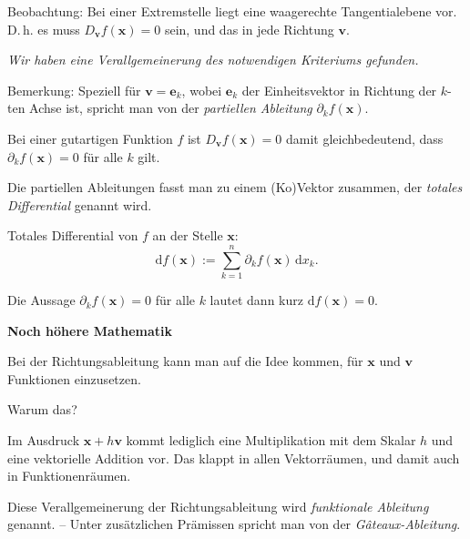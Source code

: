 \documentclass{beamer}
\newcommand{\strong}[1]{\textsf{\textbf{#1}}}
\begin{document}
\begin{frame}
Beobachtung: Bei einer Extremstelle liegt eine waagerechte
Tangentialebene vor. D.\,h. es muss $D_{\mathbf v} f(\mathbf x)=0$
sein, und das in jede Richtung $\mathbf v$.\pause

\vspace{0.8em}
\emph{Wir haben eine Verallgemeinerung des notwendigen Kriteriums
gefunden.}
\end{frame}

\begin{frame}
Bemerkung: Speziell für $\mathbf v = \mathbf e_k$, wobei
$\mathbf e_k$ der Einheitsvektor in Richtung der $k$-ten Achse ist,
spricht man von der \emph{partiellen Ableitung}
$\partial_k f(\mathbf x)$.
\pause

\vspace{0.8em}
Bei einer gutartigen Funktion $f$ ist $D_{\mathbf v}f(\mathbf x)=0$
damit gleichbedeutend, dass $\partial_k f(\mathbf x)=0$ für alle
$k$ gilt.
\end{frame}

\begin{frame}
Die partiellen Ableitungen fasst man zu einem (Ko)Vektor zusammen,
der \emph{totales Differential} genannt wird.\pause

\begin{Definition}
Totales Differential von $f$ an der Stelle $\mathbf x$:
\[\mathrm df(\mathbf x) := \sum_{k=1}^n \partial_k f(\mathbf x)\,\mathrm dx_k.\]
\end{Definition}
\pause

Die Aussage $\partial_k f(\mathbf x)=0$ für alle $k$ lautet dann
kurz $\mathrm df(\mathbf x)=0$.
\end{frame}

\begin{frame}
\begin{center}
\strong{Noch höhere Mathematik}
\end{center}
\end{frame}

\begin{frame}
Bei der Richtungsableitung kann man auf die Idee kommen, für
$\mathbf x$ und $\mathbf v$ Funktionen einzusetzen.
\pause

\vspace{0.6em}
Warum das?
\pause

\vspace{0.6em}
Im Ausdruck $\mathbf x+h\mathbf v$ kommt lediglich eine
Multiplikation mit dem Skalar $h$ und eine vektorielle Addition vor.
Das klappt in allen Vektorräumen, und damit auch in Funktionenräumen.
\pause

\vspace{0.8em}
Diese Verallgemeinerung der Richtungsableitung wird
\emph{funktionale Ableitung} genannt. -- Unter zusätzlichen
Prämissen spricht man von der \emph{Gâteaux-Ableitung}.
\end{frame}
\end{document}
